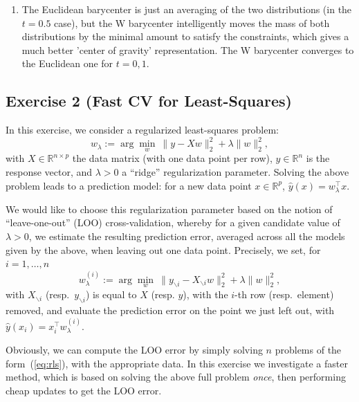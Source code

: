 \documentclass[11pt]{article}
\begin{document}
\begin{solution}
\begin{enumerate}
\item The Euclidean barycenter is just an averaging of the two distributions (in the $t = 0.5$ case), but the W barycenter intelligently moves the mass of both distributions by the minimal amount to satisfy the constraints, which gives a much better 'center of gravity' representation. The W barycenter converges to the Euclidean one for $t = 0,1$.
\end{enumerate}
\end{solution}

\newpage
\subsection*{Exercise 2 (Fast CV for Least-Squares)}

In this exercise, we consider a regularized least-squares problem:
\begin{equation}\label{eq:rls}
w_\lambda :=\arg\min_w \: \|y-Xw\|_2^2 + \lambda \|w\|_2^2,
\end{equation}
with $X \in \mathbb{R}^{n \times p}$ the data matrix (with one data point per row), $y \in \mathbb{R}^n$ is the response vector, and $\lambda>0$ a ``ridge'' regularization parameter. Solving the above problem leads to a prediction model: for a new data point $x \in \mathbb{R}^{p}$, $\hat{y}(x) = w_\lambda^\top x$.

We would like to choose this regularization parameter based on the notion of ``leave-one-out''  (LOO) cross-validation, whereby for a given candidate value of $\lambda>0$, we estimate the resulting prediction error, averaged across all the models given by the above, when leaving out one data point. Precisely, we set, for $i=1,\ldots,n$
\[
w^{(i)}_\lambda := \arg\min_w \: \|y_{\backslash i}-X_{\backslash i}w\|_2^2 + \lambda \|w\|_2^2,
\]
with $X_{\backslash i}$ (resp.\ $y_{\backslash i}$) is equal to $X$ (resp. $y$), with the $i$-th row (resp.\ element) removed, and evaluate the prediction error on the point we just left out, with $\hat{y}(x_i) = x_i^\top w^{(i)}_\lambda$.

Obviously, we can compute the LOO error by simply solving $n$ problems of the form~(\ref{eq:rls}), with the appropriate data. In this exercise we investigate a faster method, which is based on solving the above full problem \emph{once}, then performing cheap updates to get the LOO error.
\end{document}
